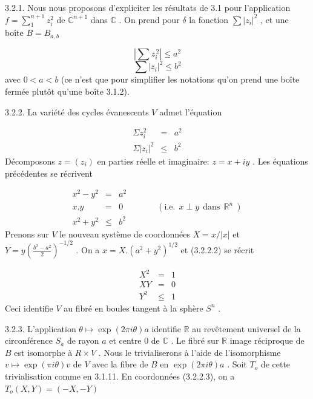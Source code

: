 3.2.1. Nous nous proposons d'expliciter les résultats de 3.1 pour l'application $f = \sum\limits_{1}^{n+1} z_i^2$ de $\mathbb{C}^{n+1}$ dans $\mathbb{C}$ . On prend pour $\delta$ la fonction $\sum |z_i|^2$ , et une boîte $B = B_{a,b}$

\begin{equation*}
| \sum z_i^{\,2} | \leq a^2
\end{equation*}
\begin{equation*}
\sum |z_i|^2 \leq b^2
\end{equation*}
avec $0 < a < b$ (ce n'est que pour simplifier les notations qu'on prend une boîte
fermée plutôt qu'une boîte 3.1.2).

3.2.2. La variété des cycles évanescents $V$ admet l'équation

\begin{equation}\tag{3.2.2.1}
\begin{array}{rcl}
\Sigma z_i^2 & = & a^2 \\
\Sigma |z_i|^2 & \leq & b^2
\end{array}
\end{equation}
Décomposons $z = (z_i)$ en parties réelle et imaginaire: $z = x + iy$ . Les équations précédentes se récrivent

\begin{equation}\tag{3.2.2.2}
\begin{array}{rcl}
x^2 - y^2 & = & a^2 \\
x.y & = & 0 \qquad\qquad (\mathrm{i.e.}\ \ x \perp y\ \ \mathrm{dans}\ \ \mathbb{R}^n\ ) \\
x^2 + y^2 & \leq & b^2
\end{array}
\end{equation}
Prenons sur $V$ le nouveau système de coordonnées $X = x/|x|$ et $Y = y(\frac{b^2-a^2}{2})^{-1/2}$ . On a $x = X. (a^2 + y^2)^{1/2}$ et (3.2.2.2) se récrit

\begin{equation}\tag{3.2.2.3}
\begin{array}{rcl}
X^2 & = & 1 \\
XY & = & 0 \\
Y^2 & \leq & 1
\end{array}
\end{equation}
Ceci identifie $V$ au fibré en boules tangent à la sphère $S^n$ .

3.2.3. L'application $\theta \longmapsto \exp(2\pi i\theta)a$ identifie $\mathbb{R}$ au revêtement universel de la circonférence $S_a$ de rayon $a$ et centre $0$ de $\mathbb{C}$ . Le fibré sur $\mathbb{R}$ image réciproque de $B$ est isomorphe à $R \times V$ . Nous le trivialiserons à l'aide de l'isomorphisme $v \longmapsto \exp (\pi i\theta)v$ de $V$ avec la fibre de $B$ en $\exp(2\pi i\theta)a$ . Soit $T_o$ de cette trivialisation comme en 3.1.11. En coordonnées (3.2.2.3), on a $T_o(X,Y) = (-X, -Y)$

